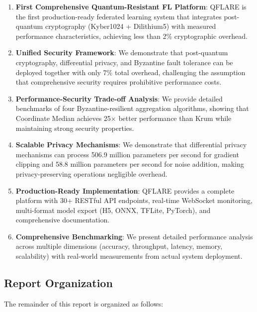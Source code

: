 \documentclass[12pt,a4paper]{article}
\begin{document}
\begin{enumerate}
    \item \textbf{First Comprehensive Quantum-Resistant FL Platform}: QFLARE is the first production-ready federated learning system that integrates post-quantum cryptography (Kyber1024 + Dilithium5) with measured performance characteristics, achieving less than 2\% cryptographic overhead.
    
    \item \textbf{Unified Security Framework}: We demonstrate that post-quantum cryptography, differential privacy, and Byzantine fault tolerance can be deployed together with only 7\% total overhead, challenging the assumption that comprehensive security requires prohibitive performance costs.
    
    \item \textbf{Performance-Security Trade-off Analysis}: We provide detailed benchmarks of four Byzantine-resilient aggregation algorithms, showing that Coordinate Median achieves 25× better performance than Krum while maintaining strong security properties.
    
    \item \textbf{Scalable Privacy Mechanisms}: We demonstrate that differential privacy mechanisms can process 506.9 million parameters per second for gradient clipping and 58.8 million parameters per second for noise addition, making privacy-preserving operations negligible overhead.
    
    \item \textbf{Production-Ready Implementation}: QFLARE provides a complete platform with 30+ RESTful API endpoints, real-time WebSocket monitoring, multi-format model export (H5, ONNX, TFLite, PyTorch), and comprehensive documentation.
    
    \item \textbf{Comprehensive Benchmarking}: We present detailed performance analysis across multiple dimensions (accuracy, throughput, latency, memory, scalability) with real-world measurements from actual system deployment.
\end{enumerate}

\subsection{Report Organization}

The remainder of this report is organized as follows:
\end{document}
